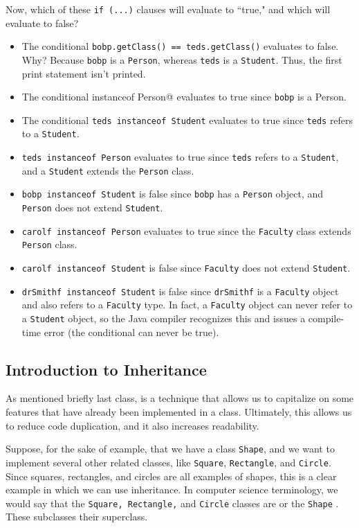 Now, which of these \verb!if (...)! clauses will evaluate to ``true," and which will evaluate to false? 
\begin{itemize}
    \item The conditional \verb!bobp.getClass() == teds.getClass()! evaluates to false. Why? Because \verb!bobp! is a \verb!Person!, whereas \verb!teds! is a  \verb!Student!. Thus, the first print statement isn't printed.
    \item The conditional \verb@bobp instanceof Person@ evaluates to true since \verb!bobp! is a Person.
    \item The conditional \verb!teds instanceof Student! evaluates to true since \verb!teds! refers to a \verb!Student!.
    \item \verb!teds instanceof Person! evaluates to true since \verb!teds! refers to a \verb!Student!, and a \verb!Student! extends the \verb!Person! class.
    \item \verb!bobp instanceof Student! is false since \verb!bobp! has a \verb!Person! object, and \verb!Person! does not extend \verb!Student!.
    \item \verb!carolf instanceof Person! evaluates to true since the \verb!Faculty! class extends \verb!Person! class. 
    \item \verb!carolf instanceof Student! is false since \verb!Faculty! does not extend \verb!Student!.
    \item \verb!drSmithf instanceof Student! is false since \verb!drSmithf! is a \verb!Faculty! object and also refers to a \verb!Faculty! type. In fact, a \verb!Faculty! object can never refer to a \verb!Student! object, so the Java compiler recognizes this and issues a compile-time error (the conditional can never be true).
\end{itemize}

\subsection{Introduction to Inheritance}

As mentioned briefly last class,  is a technique that allows us to capitalize on some features that have already been implemented in a class. Ultimately, this allows us to reduce code duplication, and it also increases readability.


Suppose, for the sake of example, that we have a class \verb!Shape!, and we want to implement several other related classes, like \verb!Square!, \verb!Rectangle!, and \verb!Circle!. Since squares, rectangles, and circles are all examples of shapes, this is a clear example in which we can use inheritance. In computer science terminology, we would say that the \verb!Square, Rectangle,! and \verb!Circle! classes are  or the \verb!Shape! . These subclasses  their superclass. 

